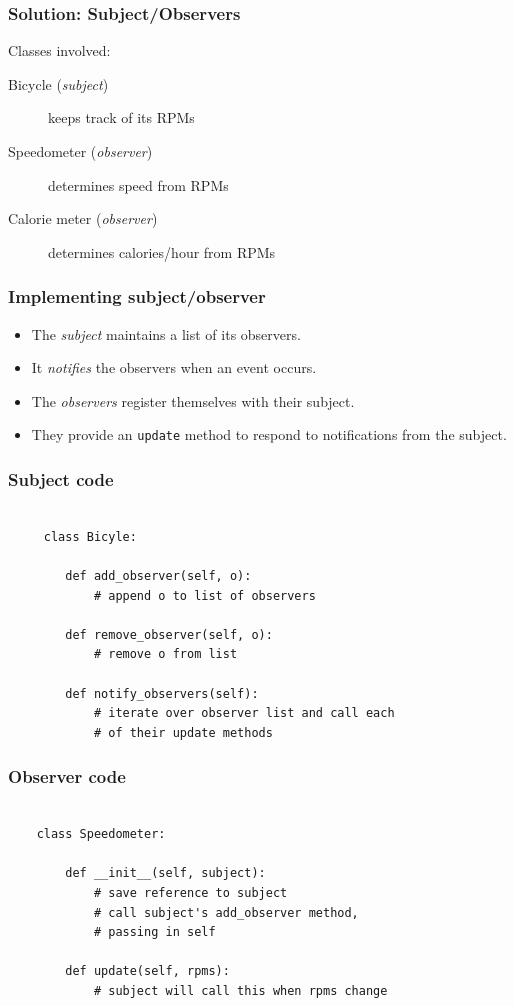 \documentclass[10pt]{beamer}
\begin{document}
\begin{frame}
	\frametitle{Solution: Subject/Observers}

	Classes involved:
	\begin{description}
		\item[Bicycle (\emph{subject})] keeps track of its RPMs
		\item[Speedometer (\emph{observer})] determines speed from RPMs
		\item[Calorie meter (\emph{observer})] determines calories/hour from RPMs
	\end{description}
\end{frame}

\begin{frame}
	\frametitle{Implementing subject/observer}

	\begin{itemize}
		\item The \emph{subject} maintains a list of its observers.
		\item It \emph{notifies} the observers when an event occurs.
		\item The \emph{observers} register themselves with their subject.
		\item They provide an \texttt{update} method to respond to 
			notifications from the subject.
	\end{itemize}
\end{frame}

\begin{frame}[fragile]
	\frametitle{Subject code}

	\begin{verbatim}

     class Bicyle:

        def add_observer(self, o):
            # append o to list of observers

        def remove_observer(self, o):
            # remove o from list

        def notify_observers(self):
            # iterate over observer list and call each
            # of their update methods

	    \end{verbatim}
\end{frame}

\begin{frame}[fragile]
	\frametitle{Observer code}

	\begin{verbatim}

    class Speedometer:
        
        def __init__(self, subject):
            # save reference to subject
            # call subject's add_observer method, 
            # passing in self

        def update(self, rpms):
            # subject will call this when rpms change


	    \end{verbatim}
\end{frame}
\end{document}
